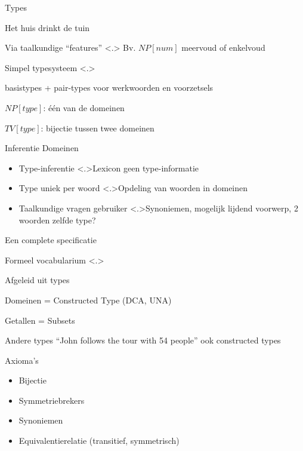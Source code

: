 \documentclass[notes, dvipsnames]{beamer}
\newcommand{\seperation}{
	\vspace{1em}
	\ppause
}
\newcommand{\hitem}{
	\ppause
	\item
}
\newcommand{\ppause}{\onslide<+>}
\newcommand{\nnote}[1]{\note<.>{#1}}
\begin{document}
	\begin{frame}{Types}
    \begin{itemize}
      \hitem Het huis drinkt de tuin

      \seperation
      \item Via taalkundige ``features''
      \nnote{
        Bv. $NP[num]$ meervoud of enkelvoud
      }

      \seperation
      \item Simpel typesysteem
      \nnote{
        \item basistypes + pair-types voor werkwoorden en voorzetsels
        \item $NP[type]$: één van de domeinen
        \item $TV[type]$: bijectie tussen twee domeinen
      }
    \end{itemize}
	\end{frame}

  \begin{frame}{Inferentie Domeinen}
    \begin{itemize}
      \hitem Type-inferentie
      \nnote{Lexicon geen type-informatie}
      \hitem Type uniek per woord
      \nnote{Opdeling van woorden in domeinen}
      \hitem Taalkundige vragen gebruiker
      \nnote{Synoniemen, mogelijk lijdend voorwerp, 2 woorden zelfde type?}
    \end{itemize}
  \end{frame}

  \begin{frame}{Een complete specificatie}
    \begin{itemize}
      \hitem Formeel vocabularium
      \nnote{
        \item Afgeleid uit types
        \item Domeinen = Constructed Type (DCA, UNA)
        \item Getallen = Subsets
        \item Andere types ``John follows the tour with 54 people'' ook constructed types
      }
      \hitem Axioma's
      \begin{itemize}
        \hitem Bijectie
        \hitem Symmetriebrekers
        \hitem Synoniemen
        \hitem Equivalentierelatie (transitief, symmetrisch)
      \end{itemize}
    \end{itemize}
  \end{frame}
\end{document}
